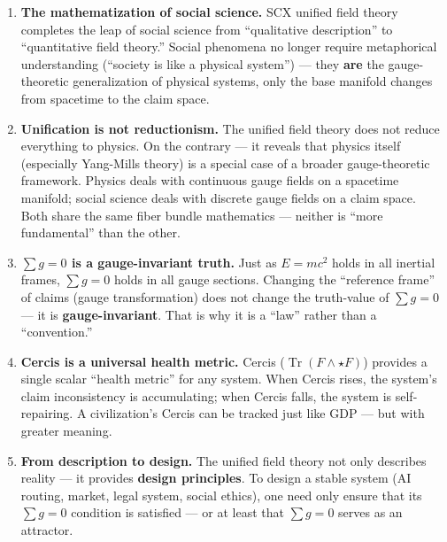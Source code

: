 \documentclass[12pt,a4paper]{article}
\theoremstyle{plain}
\theoremstyle{definition}
\newcommand{\curv}{F}
\DeclareMathOperator{\Tr}{Tr}
\begin{document}
\begin{enumerate}[label=\textbf{Implication \arabic*:}]

    \item \textbf{The mathematization of social science.} SCX unified field theory completes the leap of social science from
    ``qualitative description'' to ``quantitative field theory.'' Social phenomena no longer require metaphorical understanding
    (``society is like a physical system'') — they \textbf{are} the gauge-theoretic generalization of physical systems,
    only the base manifold changes from spacetime to the claim space.

    \item \textbf{Unification is not reductionism.} The unified field theory does not reduce everything to physics.
    On the contrary — it reveals that physics itself (especially Yang-Mills theory) is a special case of a broader
    gauge-theoretic framework. Physics deals with continuous gauge fields on a spacetime manifold;
    social science deals with discrete gauge fields on a claim space. Both share the same fiber bundle mathematics —
    neither is ``more fundamental'' than the other.

    \item \textbf{$\sum g = 0$ is a gauge-invariant truth.} Just as $E = mc^2$ holds
    in all inertial frames, $\sum g = 0$ holds in all gauge sections.
    Changing the ``reference frame'' of claims (gauge transformation) does not change the truth-value of $\sum g = 0$ —
    it is \textbf{gauge-invariant}. That is why it is a ``law'' rather than a ``convention.''

    \item \textbf{Cercis is a universal health metric.} Cercis ($\Tr(\curv \wedge \star \curv)$)
    provides a single scalar ``health metric'' for any system. When Cercis rises, the system's
    claim inconsistency is accumulating; when Cercis falls, the system is self-repairing.
    A civilization's Cercis can be tracked just like GDP — but with greater meaning.

    \item \textbf{From description to design.} The unified field theory not only describes reality — it provides
    \textbf{design principles}. To design a stable system (AI routing, market, legal system,
    social ethics), one need only ensure that its $\sum g = 0$ condition is satisfied — or at least that
    $\sum g = 0$ serves as an attractor.

\end{enumerate}
\end{document}
